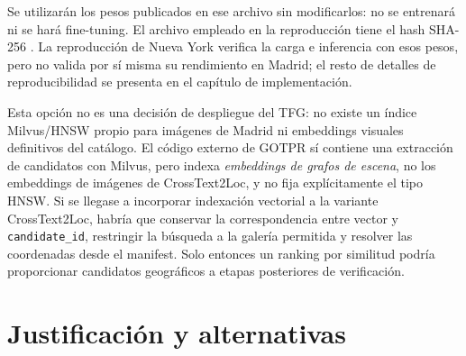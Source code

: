 Se utilizarán los pesos publicados en ese archivo sin modificarlos: no se entrenará ni se hará fine-tuning. El archivo empleado en la reproducción tiene el hash SHA-256 . La reproducción de Nueva York verifica la carga e inferencia con esos pesos, pero no valida por sí misma su rendimiento en Madrid; el resto de detalles de reproducibilidad se presenta en el capítulo de implementación.

Esta opción no es una decisión de despliegue del TFG: no existe un índice Milvus/HNSW propio para imágenes de Madrid ni embeddings visuales definitivos del catálogo. El código externo de GOTPR sí contiene una extracción de candidatos con Milvus, pero indexa \emph{embeddings de grafos de escena}, no los embeddings de imágenes de CrossText2Loc, y no fija explícitamente el tipo HNSW. Si se llegase a incorporar indexación vectorial a la variante CrossText2Loc, habría que conservar la correspondencia entre vector y \texttt{candidate\_id}, restringir la búsqueda a la galería permitida y resolver las coordenadas desde el manifest. Solo entonces un ranking por similitud podría proporcionar candidatos geográficos a etapas posteriores de verificación.

\section{Justificación y alternativas}
\label{sec:alternativas}
